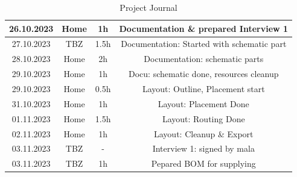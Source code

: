 \begin{table}[H]
\begin{tabular}{||c | c | c || c||}
 \hline
   26.10.2023 & Home & 1h & Documentation \& prepared Interview 1 \\ 
 \hline
  27.10.2023 & TBZ & 1.5h & Documentation: Started with schematic part \\ 
 \hline
  28.10.2023 & Home & 2h & Documentation: schematic parts \\ 
 \hline
  29.10.2023 & Home & 1h & Docu: schematic done, resources cleanup \\ 
 \hline
   29.10.2023 & Home & 0.5h & Layout: Outline, Placement start \\ 
 \hline
   31.10.2023 & Home & 1h & Layout: Placement Done \\ 
 \hline   
   01.11.2023 & Home & 1.5h & Layout: Routing Done \\ 
 \hline
  02.11.2023 & Home & 1h & Layout: Cleanup \& Export \\ 
 \hline
  03.11.2023 & TBZ & - & Interview 1: signed by mala \\ 
 \hline  
  03.11.2023 & TBZ & 1h & Pepared BOM for supplying \\ 
 \hline

\end{tabular}
    \caption{Project Journal}\label{tab:Project Journal}
\end{table}
\newpage

